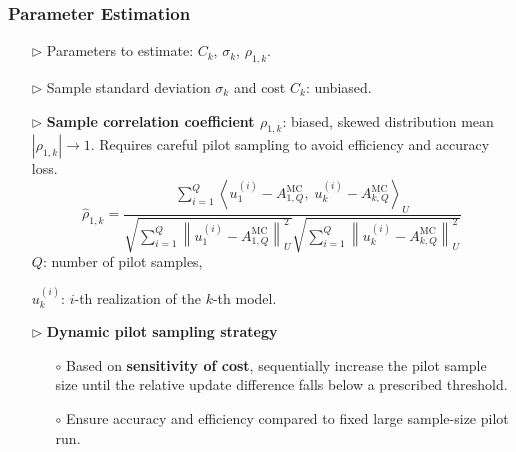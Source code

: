 \documentclass{beamer}
\begin{document}
\begin{frame}[t]
\frametitle{Parameter Estimation}
{\small
\begin{itemize}[leftmargin=5pt] 
\item[$\triangleright$] Parameters to estimate: $C_k$, $\sigma_k$, $\rho_{1,k}$.
\item[$\triangleright$] Sample standard deviation $\sigma_k$ and cost $C_k$: unbiased.
\item[$\triangleright$] \textcolor{myblue3}{\bf Sample correlation coefficient $\rho_{1,k}$}: biased, skewed distribution mean $|\rho_{1,k}|\rightarrow 1$. Requires careful pilot sampling to avoid efficiency and accuracy loss.
%
\[
\widehat{\rho}_{1,k} = \frac{\sum_{i=1}^Q\left\langle u_{1}^{(i)} - A_{1,Q}^{\text{MC}},\; u_{k}^{(i)} - A_{k,Q}^{\text{MC}} \right\rangle_U}{\sqrt{\sum_{i=1}^Q \left\|u_{1}^{(i)} - A_{1,Q}^{\text{MC}}\right\|_U^2} \sqrt{\sum_{i=1}^Q \left\|u_{k}^{(i)} - A_{k,Q}^{\text{MC}}\right\|_U^2}}
\]
%
$Q$: number of pilot samples,

$u_k^{(i)}$: $i$-th realization of the $k$-th model.

\item[$\triangleright$] \textcolor{myblue3}{\bf Dynamic pilot sampling strategy}

\begin{itemize}[leftmargin=15pt] 
    \item[$\circ$] Based on \textcolor{myblue3}{\bf sensitivity of cost}, sequentially increase the pilot sample size until the relative update difference falls below a prescribed threshold.
    \item[$\circ$] Ensure accuracy and efficiency compared to fixed large sample-size pilot run.
\end{itemize}
\end{itemize}
}
\end{frame}
\end{document}
